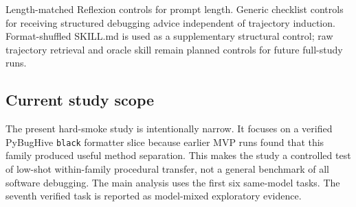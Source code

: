 Length-matched Reflexion controls for prompt length. Generic checklist controls for receiving structured debugging advice independent of trajectory induction. Format-shuffled SKILL.md is used as a supplementary structural control; raw trajectory retrieval and oracle skill remain planned controls for future full-study runs.

\subsection{Current study scope}
\label{sec:method_scope}

The present hard-smoke study is intentionally narrow. It focuses on a verified PyBugHive \texttt{black} formatter slice because earlier MVP runs found that this family produced useful method separation. This makes the study a controlled test of low-shot within-family procedural transfer, not a general benchmark of all software debugging. The main analysis uses the first six same-model tasks. The seventh verified task is reported as model-mixed exploratory evidence.

